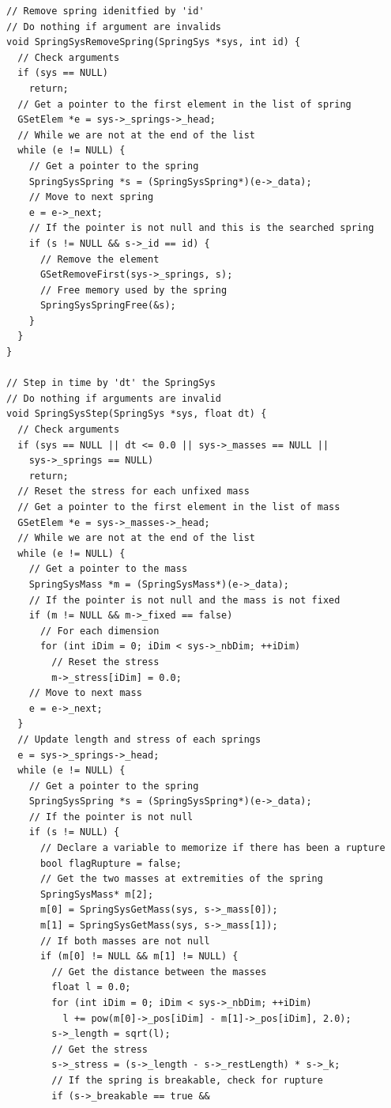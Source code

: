 \documentclass[12pt, a4paper]{article}
\begin{document}
\begin{scriptsize}
\begin{ttfamily}
\begin{lstlisting}
// Remove spring idenitfied by 'id'
// Do nothing if argument are invalids
void SpringSysRemoveSpring(SpringSys *sys, int id) {
  // Check arguments
  if (sys == NULL)
    return;
  // Get a pointer to the first element in the list of spring
  GSetElem *e = sys->_springs->_head;
  // While we are not at the end of the list
  while (e != NULL) {
    // Get a pointer to the spring
    SpringSysSpring *s = (SpringSysSpring*)(e->_data);
    // Move to next spring
    e = e->_next;
    // If the pointer is not null and this is the searched spring
    if (s != NULL && s->_id == id) {
      // Remove the element
      GSetRemoveFirst(sys->_springs, s);
      // Free memory used by the spring
      SpringSysSpringFree(&s);
    }
  }
}

// Step in time by 'dt' the SpringSys
// Do nothing if arguments are invalid
void SpringSysStep(SpringSys *sys, float dt) {
  // Check arguments
  if (sys == NULL || dt <= 0.0 || sys->_masses == NULL || 
    sys->_springs == NULL)
    return;
  // Reset the stress for each unfixed mass
  // Get a pointer to the first element in the list of mass
  GSetElem *e = sys->_masses->_head;
  // While we are not at the end of the list
  while (e != NULL) {
    // Get a pointer to the mass
    SpringSysMass *m = (SpringSysMass*)(e->_data);
    // If the pointer is not null and the mass is not fixed
    if (m != NULL && m->_fixed == false)
      // For each dimension
      for (int iDim = 0; iDim < sys->_nbDim; ++iDim)
        // Reset the stress
        m->_stress[iDim] = 0.0;
    // Move to next mass
    e = e->_next;
  }
  // Update length and stress of each springs
  e = sys->_springs->_head;
  while (e != NULL) {
    // Get a pointer to the spring
    SpringSysSpring *s = (SpringSysSpring*)(e->_data);
    // If the pointer is not null
    if (s != NULL) {
      // Declare a variable to memorize if there has been a rupture
      bool flagRupture = false;
      // Get the two masses at extremities of the spring
      SpringSysMass* m[2];
      m[0] = SpringSysGetMass(sys, s->_mass[0]);
      m[1] = SpringSysGetMass(sys, s->_mass[1]);
      // If both masses are not null
      if (m[0] != NULL && m[1] != NULL) {
        // Get the distance between the masses
        float l = 0.0;
        for (int iDim = 0; iDim < sys->_nbDim; ++iDim)
          l += pow(m[0]->_pos[iDim] - m[1]->_pos[iDim], 2.0);
        s->_length = sqrt(l);
        // Get the stress 
        s->_stress = (s->_length - s->_restLength) * s->_k;
        // If the spring is breakable, check for rupture
        if (s->_breakable == true &&

\end{lstlisting}
\end{ttfamily}
\end{scriptsize}
\end{document}
